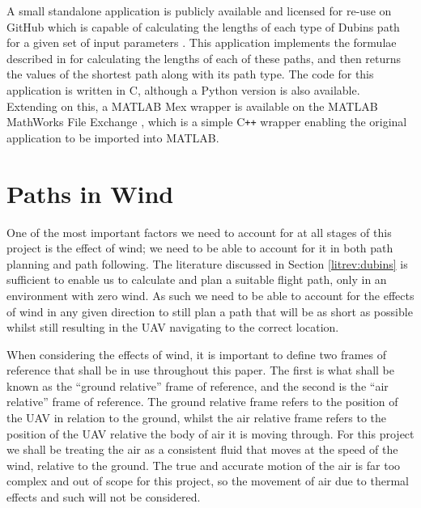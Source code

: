 A small standalone application is publicly available and licensed for re-use on GitHub which is capable of calculating the lengths of each type of Dubins path for a given set of input parameters \cite{WalkerDubinsCurves}. This application implements the formulae described in \cite{shkel2001classification} for calculating the lengths of each of these paths, and then returns the values of the shortest path along with its path type. The code for this application is written in C, although a Python version is also available. Extending on this, a MATLAB Mex wrapper is available on the MATLAB MathWorks File Exchange \cite{MexDubinsCurves}, which is a simple C\texttt{++} wrapper enabling the original application to be imported into MATLAB.


\section{Paths in Wind}
\label{litrev:path}

One of the most important factors we need to account for at all stages of this project is the effect of wind; we need to be able to account for it in both path planning and path following. The literature discussed in Section \ref{litrev:dubins} is sufficient to enable us to calculate and plan a suitable flight path, only in an environment with zero wind. As such we need to be able to account for the effects of wind in any given direction to still plan a path that will be as short as possible whilst still resulting in the UAV navigating to the correct location.

When considering the effects of wind, it is important to define two frames of reference that shall be in use throughout this paper. The first is what shall be known as the ``ground relative'' frame of reference, and the second is the ``air relative'' frame of reference. The ground relative frame refers to the position of the UAV in relation to the ground, whilst the air relative frame refers to the position of the UAV relative the body of air it is moving through. For this project we shall be treating the air as a consistent fluid that moves at the speed of the wind, relative to the ground. The true and accurate motion of the air is far too complex and out of scope for this project, so the movement of air due to thermal effects and such will not be considered. 

